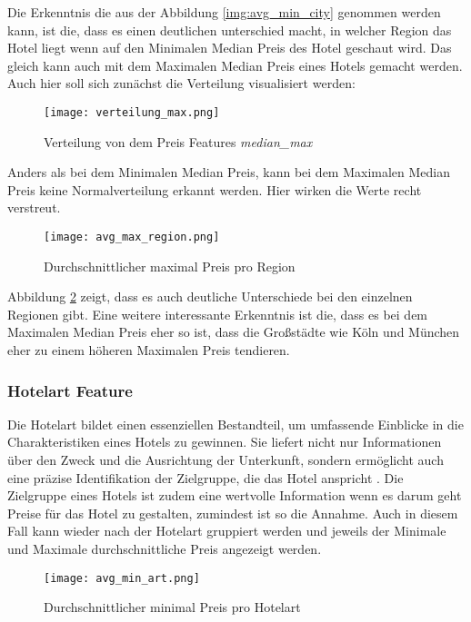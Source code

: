 Die Erkenntnis die aus der Abbildung \ref{img:avg_min_city} genommen werden kann, ist die, dass es einen deutlichen unterschied macht, in welcher Region das Hotel liegt wenn auf den Minimalen Median Preis des Hotel geschaut wird. Das gleich kann auch mit dem Maximalen Median Preis eines Hotels gemacht werden. Auch hier soll sich zunächst die Verteilung visualisiert werden:

\begin{figure}[h]
    \centering
    \texttt{[image: verteilung\_max.png]}
    \caption[Verteilung von dem Preis Features \emph{median\_max}]{Verteilung von dem Preis Features \emph{median\_max}}
    \label{img:verteilung_max}
\end{figure}

Anders als bei dem Minimalen Median Preis, kann bei dem Maximalen Median Preis keine Normalverteilung erkannt werden. Hier wirken die Werte recht verstreut.

\begin{figure}[h]
    \centering
    \texttt{[image: avg\_max\_region.png]}
    \caption[Durchschnittlicher maximal Preis pro Region]{Durchschnittlicher maximal Preis pro Region}
    \label{img:avg_max_city}
\end{figure}

Abbildung \ref{img:avg_max_city} zeigt, dass es auch deutliche Unterschiede bei den einzelnen Regionen gibt. Eine weitere interessante Erkenntnis ist die, dass es bei dem Maximalen Median Preis eher so ist, dass die Großstädte wie Köln und München eher zu einem höheren Maximalen Preis tendieren.

\subsubsection{Hotelart Feature}
Die Hotelart bildet einen essenziellen Bestandteil, um umfassende Einblicke in die Charakteristiken eines Hotels zu gewinnen. Sie liefert nicht nur Informationen über den Zweck und die Ausrichtung der Unterkunft, sondern ermöglicht auch eine präzise Identifikation der Zielgruppe, die das Hotel anspricht \cite{User.20.01.2024}. Die Zielgruppe eines Hotels ist zudem eine wertvolle Information wenn es darum geht Preise für das Hotel zu gestalten, zumindest ist so die Annahme. Auch in diesem Fall kann wieder nach der Hotelart gruppiert werden und jeweils der Minimale und Maximale durchschnittliche Preis angezeigt werden.

\begin{figure}[h]
    \centering
    \texttt{[image: avg\_min\_art.png]}
    \caption[Durchschnittlicher minimal Preis pro Hotelart]{Durchschnittlicher minimal Preis pro Hotelart}
    \label{img:avg_min_art}
\end{figure}

